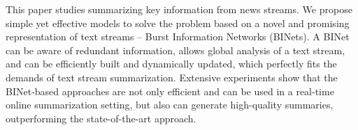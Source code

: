 This paper studies summarizing key information from news streams. We propose simple yet effective models to solve the problem based on a novel and promising representation of text streams -- Burst Information Networks (BINets). A BINet can be aware of redundant information, allows global analysis of a text stream, and can be efficiently built and dynamically updated, which perfectly fits the demands of text stream summarization. Extensive experiments show that the BINet-based approaches are not only efficient and can be used in a real-time online summarization setting, but also can generate high-quality summaries, outperforming the state-of-the-art approach.
